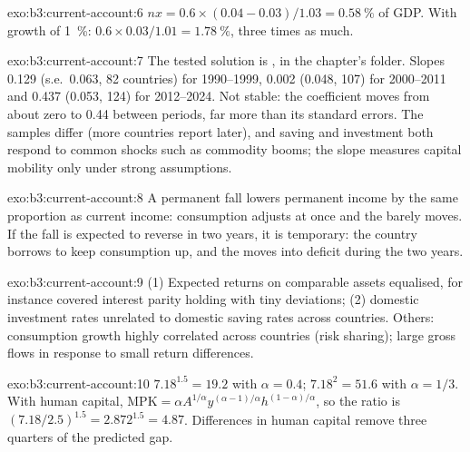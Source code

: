 \begin{solution}{exo:b3:current-account:6}
$nx = 0.6 \times (0.04 - 0.03)/1.03 = 0.58~\%$ of GDP. With growth of 1~\%: $0.6 \times 0.03/1.01 =
1.78~\%$, three times as much.
\end{solution}

\begin{solution}{exo:b3:current-account:7}
The tested solution is , in the chapter's
 folder. Slopes 0.129 (s.e.\ 0.063, 82 countries) for 1990--1999, 0.002
(0.048, 107) for 2000--2011 and 0.437 (0.053, 124) for 2012--2024. %
Not stable: the coefficient moves from about zero to 0.44 between periods, far
more than its standard errors. The samples differ (more countries report later),
and saving and investment both respond to common shocks such as commodity booms;
the slope measures capital mobility only under strong assumptions.
\end{solution}

\begin{solution}{exo:b3:current-account:8}
A permanent fall lowers permanent income by the same proportion as current
income: consumption adjusts at once and the  barely moves. If the
fall is expected to reverse in two years, it is temporary: the country borrows to
keep consumption up, and the  moves into deficit during the two
years.
\end{solution}

\begin{solution}{exo:b3:current-account:9}
(1) Expected returns on comparable assets equalised, for instance covered
interest parity holding with tiny deviations; (2) domestic investment rates
unrelated to domestic saving rates across countries. Others: consumption growth
highly correlated across countries (risk sharing); large gross flows in response to
small return differences.
\end{solution}

\begin{solution}{exo:b3:current-account:10}
$7.18^{1.5} = 19.2$ with $\alpha = 0.4$; $7.18^2 = 51.6$ with $\alpha = 1/3$. With human capital,
$\mathrm{MPK} = \alpha A^{1/\alpha}y^{(\alpha - 1)/\alpha}h^{(1 - \alpha)/\alpha}$, so the ratio is $(7.18/2.5)^{1.5} = 2.872^{1.5}
= 4.87$. Differences in human capital remove three quarters of the predicted gap.
\end{solution}

